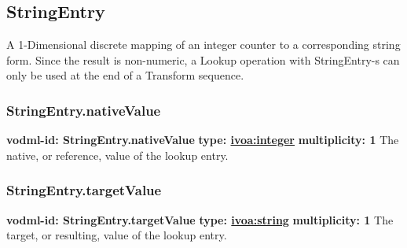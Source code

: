   \subsection{StringEntry}
  \label{sect:StringEntry}
    A 1-Dimensional discrete mapping of an integer counter to a corresponding string form. Since the result is non-numeric, a Lookup operation with StringEntry-s can only be used at the end of a Transform sequence.

    \subsubsection{StringEntry.nativeValue}
      \textbf{vodml-id: StringEntry.nativeValue} \newline
      \textbf{type: \hyperref[sect:ivoa]{ivoa:integer}} \newline
      \textbf{multiplicity: 1} \newline 
      The native, or reference, value of the lookup entry.

    \subsubsection{StringEntry.targetValue}
      \textbf{vodml-id: StringEntry.targetValue} \newline
      \textbf{type: \hyperref[sect:ivoa]{ivoa:string}} \newline
      \textbf{multiplicity: 1} \newline 
      The target, or resulting, value of the lookup entry.


